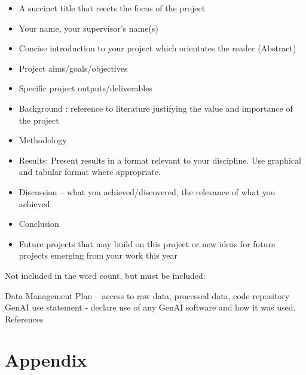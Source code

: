 \documentclass[12pt]{article}
\begin{document}
\begin{itemize}
    \item A succinct title that reects the focus of the project
    \item Your name, your supervisor’s name(s)
    \item Concise introduction to your project which orientates the reader (Abstract)
    \item Project aims/goals/objectives
    \item Specific project outputs/deliverables
    \item Background : reference to literature justifying the value and importance of the project
    \item Methodology
    \item Results: Present results in a format relevant to your discipline. Use graphical and tabular format where appropriate.
    \item Discussion – what you achieved/discovered, the relevance of what you achieved
    \item Conclusion
    \item Future projects that may build on this project or new ideas for future projects emerging from your work this year
\end{itemize}



Not included in the word count, but must be included:

Data Management Plan -- access to raw data, processed data, code repository
GenAI use statement - declare use of any GenAI software and how it was used.
References
\newpage

% 





\newpage
\section{Appendix}
\end{document}
